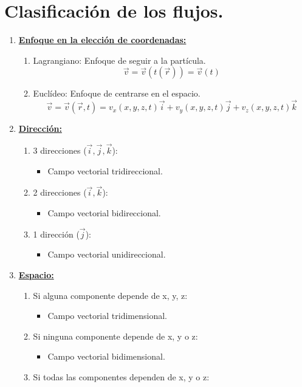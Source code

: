 \section{Clasificación de los flujos.}
\begin{enumerate}
	\item \underline{\textbf{Enfoque en la elección de coordenadas:}}
	\begin{enumerate}
		\item Lagrangiano: Enfoque de seguir a la partícula. 
		\[\vec{v}=\vec{v}(t(\vec{r}))=\vec{v}(t)\]
		\item Euclídeo: Enfoque de centrarse en el espacio.
		\[\vec{v}=\vec{v}(\vec{r},t)=v_x(x,y,z,t)\vec{i}+v_y(x,y,z,t)\vec{j}+v_z(x,y,z,t)\vec{k}\]
	\end{enumerate}
	\item \underline{\textbf{Dirección:}}
	\begin{enumerate}
		\item 3 direcciones ($\vec{i},\vec{j},\vec{k}$): 
		\begin{itemize}
			\item Campo vectorial tridireccional.
		\end{itemize}
		\item 2 direcciones ($\vec{i},\vec{k}$):
		\begin{itemize}
			\item Campo vectorial bidireccional.
		\end{itemize}
		\item 1 dirección ($\vec{j}$):
		\begin{itemize}
			\item Campo vectorial unidireccional.
		\end{itemize}
	\end{enumerate}
	\item \underline{\textbf{Espacio:}}
	\begin{enumerate}
		\item Si alguna componente depende de x, y, z: 
		\begin{itemize}
			\item Campo vectorial tridimensional.
		\end{itemize}
		\item Si ninguna componente depende de x, y o z: 
		\begin{itemize}
			\item Campo vectorial bidimensional.
		\end{itemize}
		\item Si todas las componentes dependen de x, y o z: 

\end{enumerate}
\end{enumerate}
